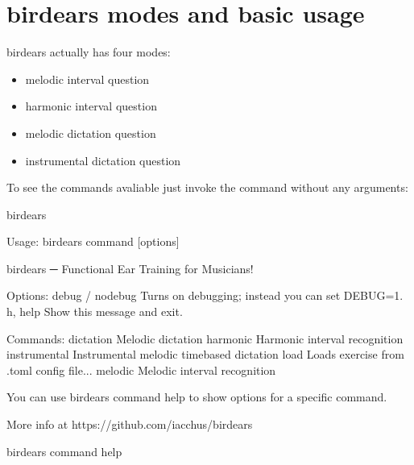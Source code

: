 \documentclass[letterpaper,10pt,english]{sphinxmanual}
\begin{document}
\section{birdears modes and basic usage}
\label{\detokenize{index:birdears-modes-and-basic-usage}}
birdears actually has four modes:
\begin{itemize}
\item {} 
melodic interval question

\item {} 
harmonic interval question

\item {} 
melodic dictation question

\item {} 
instrumental dictation question

\end{itemize}

To see the commands avaliable just invoke the command without any arguments:

%
\begin{sphinxVerbatim}[commandchars=\\\{\}]
birdears
\end{sphinxVerbatim}

%
\begin{sphinxVerbatim}[commandchars=\\\{\}]
Usage: birdears  \PYGZlt{}command\PYGZgt{} [options]

  birdears ─ Functional Ear Training for Musicians!

Options:
  \PYGZhy{}\PYGZhy{}debug / \PYGZhy{}\PYGZhy{}no\PYGZhy{}debug  Turns on debugging; instead you can set DEBUG=1.
  \PYGZhy{}h, \PYGZhy{}\PYGZhy{}help            Show this message and exit.

Commands:
  dictation     Melodic dictation
  harmonic      Harmonic interval recognition
  instrumental  Instrumental melodic time\PYGZhy{}based dictation
  load          Loads exercise from .toml config file...
  melodic       Melodic interval recognition

  You can use \PYGZsq{}birdears \PYGZlt{}command\PYGZgt{} \PYGZhy{}\PYGZhy{}help\PYGZsq{} to show options for a specific
  command.

  More info at https://github.com/iacchus/birdears
\end{sphinxVerbatim}

%
\begin{sphinxVerbatim}[commandchars=\\\{\}]
birdears \PYGZlt{}command\PYGZgt{} \PYGZhy{}\PYGZhy{}help
\end{sphinxVerbatim}
\end{document}
